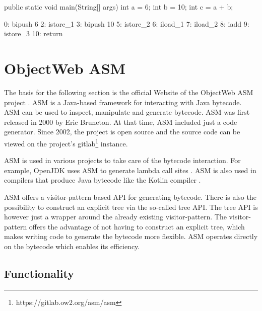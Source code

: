 \begin{JavaCode}[float,numbers=none,caption=Initialization of two variables and a third one with the sum of the first two variables in Java., label=lst:JavaNumberAdd]
public static void main(String[] args) {
    int a = 6;
    int b = 10;
    int c = a + b;
}
\end{JavaCode}

\begin{Bytecode}[float,numbers=none,caption=Bytecode of the Java program shown in listing \ref{lst:JavaNumberAdd}., label=lst:JavaNumberAddBytecode]
    0: bipush        6
    2: istore_1
    3: bipush        10
    5: istore_2
    6: iload_1
    7: iload_2
    8: iadd
    9: istore_3
   10: return
\end{Bytecode}

\section{ObjectWeb ASM}

The basis for the following section is the official Website of the ObjectWeb ASM project \parencite{ASMWeb2024}. ASM is a Java-based framework for interacting with Java bytecode. ASM can be used to inspect, manipulate and generate bytecode. ASM was first released in 2000 by Eric Bruneton. At that time, ASM included just a code generator. Since 2002, the project is open source and the source code can be viewed on the project's gitlab\footnote{https://gitlab.ow2.org/asm/asm} instance. 

ASM is used in various projects to take care of the bytecode interaction. For example, OpenJDK uses ASM to generate lambda call sites \parencite{OpenJdk2024}. ASM is also used in compilers that produce Java bytecode like the Kotlin compiler \parencite{Kotlin2024}. 

ASM offers a visitor-pattern based API for generating bytecode. There is also the possibility to construct an explicit tree via the so-called tree API. The tree API is however just a wrapper around the already existing visitor-pattern. The visitor-pattern offers the advantage of not having to construct an explicit tree, which makes writing code to generate the bytecode more flexible. ASM operates directly on the bytecode which enables its efficiency.     

\subsection{Functionality}

